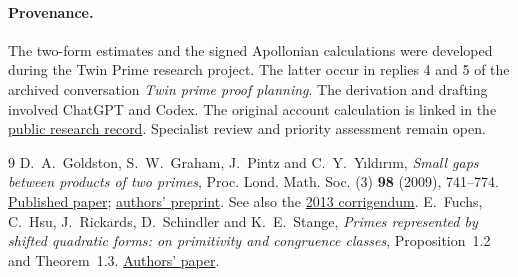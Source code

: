 \documentclass[11pt]{article}
\begin{document}
\paragraph{Provenance.}
The two-form estimates and the signed Apollonian calculations were developed during the Twin Prime research project. The latter occur in replies 4 and 5 of the archived conversation \emph{Twin prime proof planning}. The derivation and drafting
involved ChatGPT and Codex. The original account calculation is
linked in the \href{https://github.com/cosmosgeek0/Twin-Prime/blob/main/history/hosted-research-responses-2026-11-25.md}{public research record}.
Specialist review and priority assessment remain open.
\begin{thebibliography}{9}
 D.~A.~Goldston, S.~W.~Graham, J.~Pintz and C.~Y.~Y{\i}ld{\i}r{\i}m,
\emph{Small gaps between products of two primes}, Proc. Lond. Math.
Soc. (3) \textbf{98} (2009), 741--774.
\href{https://doi.org/10.1112/plms/pdn046}{Published paper};
\href{https://arxiv.org/abs/math/0609615}{authors' preprint}.
See also the \href{https://doi.org/10.1112/plms/pds053}{2013 corrigendum}.
 E.~Fuchs, C.~Hsu, J.~Rickards, D.~Schindler and
K.~E.~Stange, \emph{Primes represented by shifted quadratic forms:
on primitivity and congruence classes}, Proposition~1.2 and Theorem~1.3.
\href{https://arxiv.org/abs/2504.20289}{Authors' paper}.

\end{thebibliography}
\end{document}
